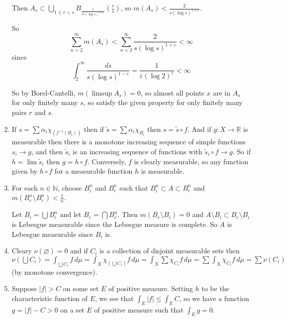 \documentclass{article}
\newcommand\RR{\mathbb R}
\newcommand\NN{\mathbb N}
\begin{document}
\begin{enumerate}
      Then $A_s \subset \bigcup_{1 \leq r < s} B_{\frac1{s^2(\log
         s)^{1+\varepsilon}}}(\frac rs)$, so $m(A_s) < \frac2{s(\log
            s)^{1+\varepsilon}}$.
            
      So \[\sum_{n=2}^\infty m(A_s) < \sum_{n=2}^\infty \frac2{s(\log
         s)^{1+\varepsilon}} < \infty\] since \[\int_2^\infty \frac{ds}{s(\log
            s)^{1-\varepsilon}} = \frac1{\varepsilon(\log2)^\varepsilon} <
            \infty \]

      So by Borel-Cantelli, $m(\limsup A_s) = 0$, so almost all points $x$ are
      in $A_s$ for only finitely many $s$, so satisfy the given property for
      only finitely many pairs $r$ and $s$.

   \item If $s = \sum \alpha_i \chi_{(f^{-1}(B_i))}$ then if $\tilde s = \sum
      \alpha_i \chi_{B_i}$ then $s = \tilde s \circ f$. And if $g : X \to \RR$
      is measurable then there is a monotone increasing sequence of simple
      functions $s_i \to g$, and then $\tilde s_i$ is an increasing sequence of
      functions with $\tilde s_i \circ f \to g$. So if $h = \lim \tilde s_i$
      then $g = h \circ f$. Conversely, $f$ is clearly measurable, so any
      function given by $h \circ f$ for a measurable function $h$ is measurable.

   \item For each $n \in \NN$, choose $B^n_i$ and $B^n_e$ such that $B^n_i
      \subset A \subset B^n_e$ and $m(B^n_e \setminus B^n_i) < \frac1n$.

      Let $B_i = \bigcup B^n_i$ and let $B_e = \bigcap B^n_e$. Then $m(B_e
      \setminus B_i) = 0$ and $A \setminus B_i \subset B_e \setminus B_i$ is
      Lebesgue measurable since the Lebesgue measure is complete. So $A$ is
      Lebesgue measurable since $B_i$ is.

   \item Cleary $\nu(\varnothing) = 0$ and if $C_i$ is a collection of disjoint
      measurable sets then $\nu(\bigcup C_i) = \int_{\bigcup C_i} f\,d\mu =
      \int_X \chi_{(\bigcup C_i)} f\,d\mu = \int_X \sum \chi_{C_i} f\,d\mu =
      \sum \int_X \chi_{C_i} f\,d\mu = \sum \nu(C_i)$ (by monotone convergence).

   \item Suppose $|f| > C$ on some set $E$ of positive measure. Setting $h$ to
      be the characteristic function of $E$, we see that $\int_E |f| \leq \int_E
      C$, so we have a function $g = |f| - C > 0$ on a set $E$ of positive
      measure such that $\int_E g = 0$.


\end{enumerate}
\end{document}
